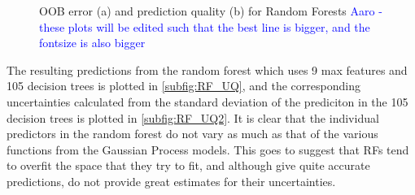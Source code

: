 \documentclass[a4paper, twoside, final, 12pt]{article}
\begin{document}
{\begin{figure}
\begin{subfigure}{0.5\linewidth}
		\caption{}
		\label{subfig:rf_rmse}
	\end{subfigure}
	\caption{OOB error (a) and prediction quality (b) for Random Forests \textcolor{blue}{\@ Aaro - these plots will be edited such that the best line is bigger, and the fontsize is also bigger}}
	\label{fig:RF_exp}
\end{figure}

The resulting predictions from the random forest which uses 9 max features and 105 decision trees is plotted in \ref{subfig:RF_UQ}, and the corresponding uncertainties calculated from the standard deviation of the prediciton in the 105 decision trees is plotted in \ref{subfig:RF_UQ2}.
It is clear that the individual predictors in the random forest do not vary as much as that of the various functions from the Gaussian Process models. 
This goes to suggest that RFs tend to overfit the space that they try to fit, and although give quite accurate predictions, do not provide great estimates for their uncertainties. 

}
\end{document}
